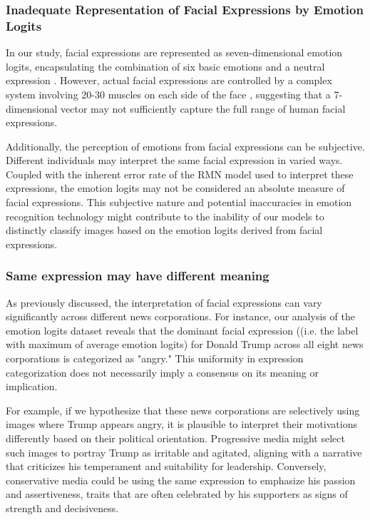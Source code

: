 \documentclass[sigconf]{acmart}
\begin{document}
\subsubsection{Inadequate Representation of Facial Expressions by Emotion Logits}

In our study, facial expressions are represented as seven-dimensional emotion logits, encapsulating the combination of six basic emotions and a neutral expression \cite{compoundemotion}. However, actual facial expressions are controlled by a complex system involving 20-30 muscles on each side of the face \cite{muscle}, suggesting that a 7-dimensional vector may not sufficiently capture the full range of human facial expressions.

Additionally, the perception of emotions from facial expressions can be subjective. Different individuals may interpret the same facial expression in varied ways. Coupled with the inherent error rate of the RMN model used to interpret these expressions, the emotion logits may not be considered an absolute measure of facial expressions. This subjective nature and potential inaccuracies in emotion recognition technology might contribute to the inability of our models to distinctly classify images based on the emotion logits derived from facial expressions.



\subsubsection{Same expression may have different meaning}

As previously discussed, the interpretation of facial expressions can vary significantly across different news corporations. For instance, our analysis of the emotion logits dataset reveals that the dominant facial expression ((i.e. the label with maximum of average emotion logits) for Donald Trump across all eight news corporations is categorized as "angry."  This uniformity in expression categorization does not necessarily imply a consensus on its meaning or implication.

For example, if we hypothesize that these news corporations are selectively using images where Trump appears angry, it is plausible to interpret their motivations differently based on their political orientation. Progressive media might select such images to portray Trump as irritable and agitated, aligning with a narrative that criticizes his temperament and suitability for leadership. Conversely, conservative media could be using the same expression to emphasize his passion and assertiveness, traits that are often celebrated by his supporters as signs of strength and decisiveness.
\end{document}
